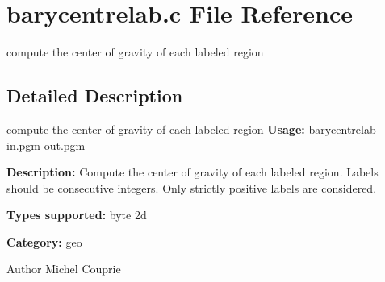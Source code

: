 \section{barycentrelab.c File Reference}
\label{barycentrelab_8c}


compute the center of gravity of each labeled region  




\subsection{Detailed Description}
compute the center of gravity of each labeled region {\bfseries Usage:} barycentrelab in.pgm out.pgm

{\bfseries Description:} Compute the center of gravity of each labeled region. Labels should be consecutive integers. Only strictly positive labels are considered.

{\bfseries Types supported:} byte 2d

{\bfseries Category:} geo

\begin{DoxyAuthor}{Author}
Michel Couprie 
\end{DoxyAuthor}
